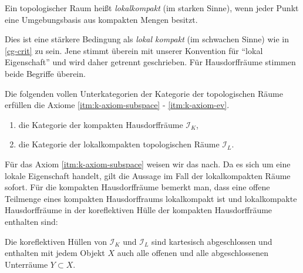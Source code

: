 \begin{defn}
  Ein topologischer Raum heißt \emph{lokalkompakt} (im starken Sinne),
  wenn jeder Punkt eine Umgebungsbasis aus kompakten Mengen besitzt.
\end{defn}
\begin{bem}
  Dies ist eine stärkere Bedingung als \emph{lokal kompakt} (im
  schwachen Sinne) wie in \ref{cg-crit} zu sein. Jene stimmt überein
  mit unserer Konvention für ``lokal Eigenschaft'' und wird daher
  getrennt geschrieben. Für Hausdorffräume stimmen beide Begriffe
  überein.
\end{bem}
\begin{prop}
  Die folgenden vollen Unterkategorien der Kategorie der topologischen
  Räume erfüllen die Axiome \ref{itm:k-axiom-subspace} -
  \ref{itm:k-axiom-ev}.
  \begin{enumerate}[label=(\roman*)]
  \item die Kategorie der kompakten Hausdorffräume $\mathcal{I}_K$,
  \item die Kategorie der lokalkompakten topologischen Räume
    $\mathcal{I}_L$.
  \end{enumerate}
\end{prop}
Für das Axiom \ref{itm:k-axiom-subspace} weisen wir das nach. Da es
sich um eine lokale Eigenschaft handelt, gilt die Aussage im Fall der
lokalkompakten Räume sofort. Für die kompakten Hausdorffräume bemerkt
man, dass eine offene Teilmenge eines kompakten Hausdorffraums
lokalkompakt ist und lokalkompakte Hausdorffräume in der koreflektiven
Hülle der kompakten Hausdorffräume enthalten sind:

\begin{kor}
  Die koreflektiven Hüllen von $\mathcal{I}_K$ und $\mathcal{I}_L$
  sind kartesisch abgeschlossen und enthalten mit jedem Objekt $X$
  auch alle offenen und alle abgeschlossenen Unterräume $Y \subset X$.
\end{kor}

